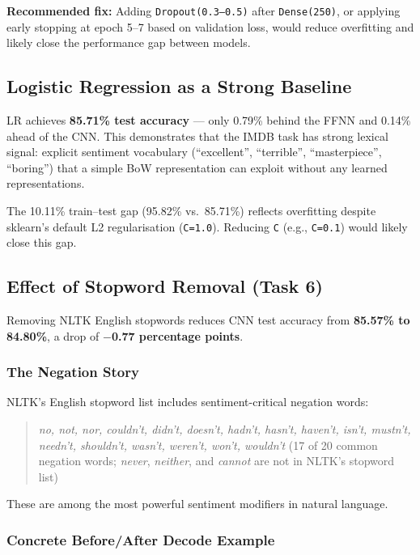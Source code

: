 \documentclass[12pt,a4paper]{article}
\begin{document}
\textbf{Recommended fix:} Adding \texttt{Dropout(0.3--0.5)} after \texttt{Dense(250)},
or applying early stopping at epoch 5--7 based on validation loss, would reduce
overfitting and likely close the performance gap between models.

\subsection{Logistic Regression as a Strong Baseline}

LR achieves \textbf{85.71\% test accuracy} --- only 0.79\% behind the FFNN and 0.14\%
ahead of the CNN. This demonstrates that the IMDB task has strong lexical signal: explicit
sentiment vocabulary (``excellent'', ``terrible'', ``masterpiece'', ``boring'') that a
simple BoW representation can exploit without any learned representations.

The 10.11\% train--test gap (95.82\% vs.\ 85.71\%) reflects overfitting despite sklearn's
default L2 regularisation (\texttt{C=1.0}). Reducing \texttt{C} (e.g., \texttt{C=0.1})
would likely close this gap.

\subsection{Effect of Stopword Removal (Task 6)}

Removing NLTK English stopwords reduces CNN test accuracy from \textbf{85.57\% to
84.80\%}, a drop of \textbf{$-$0.77 percentage points}.

\subsubsection*{The Negation Story}

NLTK's English stopword list includes sentiment-critical negation words:

\begin{quote}
\textit{no, not, nor, couldn't, didn't, doesn't, hadn't,
hasn't, haven't, isn't, mustn't, needn't, shouldn't, wasn't, weren't, won't,
wouldn't} (17 of 20 common negation words; \textit{never}, \textit{neither},
and \textit{cannot} are not in NLTK's stopword list)
\end{quote}

These are among the most powerful sentiment modifiers in natural language.

\subsubsection*{Concrete Before/After Decode Example}
\end{document}
